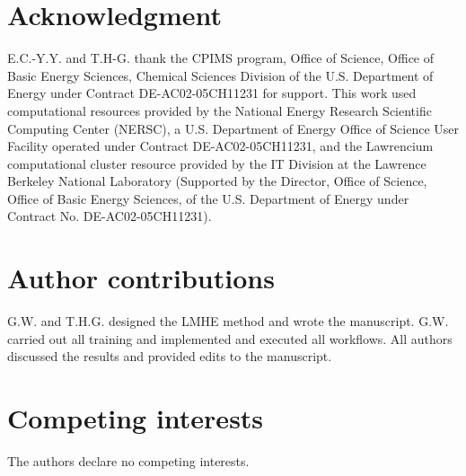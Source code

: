 \documentclass[12pt]{article}
\begin{document}
\section*{Acknowledgment}
\noindent
E.C.-Y.Y. and T.H-G. thank the CPIMS program, Office of Science, Office of Basic Energy Sciences, Chemical Sciences Division of the U.S. Department of Energy under Contract DE-AC02-05CH11231 for support. This work used computational resources provided by the National Energy Research Scientific Computing Center (NERSC), a U.S. Department of Energy Office of Science User Facility operated under Contract DE-AC02-05CH11231, and the Lawrencium computational cluster resource provided by the IT Division at the Lawrence Berkeley National Laboratory (Supported by the Director, Office of Science, Office of Basic Energy Sciences, of the U.S. Department of Energy under Contract No. DE-AC02-05CH11231).

\section*{Author contributions}
\noindent
G.W. and T.H.G. designed the LMHE method and wrote the manuscript. G.W. carried out all training and implemented and executed all workflows. All authors discussed the results and provided edits to the manuscript.

\section*{Competing interests}

The authors declare no competing interests.
\end{document}

